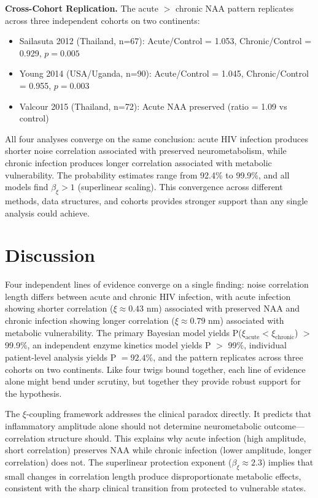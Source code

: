 \documentclass[10pt,a4paper]{article}
\begin{document}
\textbf{Cross-Cohort Replication.} The acute $>$ chronic NAA pattern replicates across three independent cohorts on two continents:
\begin{itemize}
\item Sailasuta 2012 (Thailand, n=67): Acute/Control = 1.053, Chronic/Control = 0.929, $p = 0.005$
\item Young 2014 (USA/Uganda, n=90): Acute/Control = 1.045, Chronic/Control = 0.955, $p = 0.003$
\item Valcour 2015 (Thailand, n=72): Acute NAA preserved (ratio = 1.09 vs control)
\end{itemize}

All four analyses converge on the same conclusion: acute HIV infection produces shorter noise correlation associated with preserved neurometabolism, while chronic infection produces longer correlation associated with metabolic vulnerability. The probability estimates range from 92.4\% to 99.9\%, and all models find $\beta_\xi > 1$ (superlinear scaling). This convergence across different methods, data structures, and cohorts provides stronger support than any single analysis could achieve.

\section{Discussion}

Four independent lines of evidence converge on a single finding: noise correlation length differs between acute and chronic HIV infection, with acute infection showing shorter correlation ($\xi \approx 0.43$ nm) associated with preserved NAA and chronic infection showing longer correlation ($\xi \approx 0.79$ nm) associated with metabolic vulnerability. The primary Bayesian model yields P($\xi_{\text{acute}} < \xi_{\text{chronic}}$) $>$ 99.9\%, an independent enzyme kinetics model yields P $>$ 99\%, individual patient-level analysis yields P $= 92.4\%$, and the pattern replicates across three cohorts on two continents. Like four twigs bound together, each line of evidence alone might bend under scrutiny, but together they provide robust support for the hypothesis.

The $\xi$-coupling framework addresses the clinical paradox directly. It predicts that inflammatory amplitude alone should not determine neurometabolic outcome---correlation structure should. This explains why acute infection (high amplitude, short correlation) preserves NAA while chronic infection (lower amplitude, longer correlation) does not. The superlinear protection exponent ($\beta_\xi \approx 2.3$) implies that small changes in correlation length produce disproportionate metabolic effects, consistent with the sharp clinical transition from protected to vulnerable states.
\end{document}
